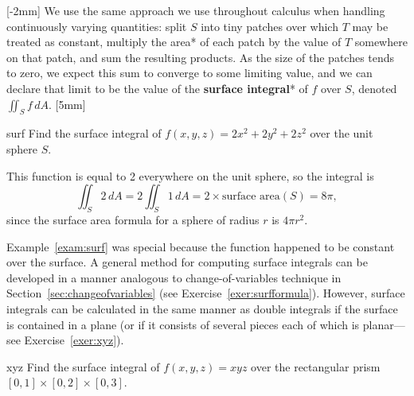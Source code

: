 \documentclass[svgnames]{watsonbook}
\begin{document}
[-2mm]
We use the same approach we use throughout calculus when handling
continuously varying quantities: split $S$ into
tiny patches over which $T$ may be treated as constant,
multiply the area* of each patch by the value of $T$ somewhere on that patch, and
sum the resulting products. As the size of the patches tends to zero,
we expect this sum to converge to some limiting value, and we can
declare that limit to be the value of the \textbf{surface integral}* of $f$ over
$S$, denoted $\iint_S f \, dA$. [5mm]

\begin{example}{}{surf}
  Find the surface integral of $f(x,y,z) = 2x^2 +2y^2 + 2z^2$ over the
  unit sphere $S$. 
\end{example}

\begin{solution}
  This function is equal to 2 everywhere on the unit sphere, so the
  integral is
  \[
    \iint_{S} 2 \,dA =     2 \iint_{S} 1 \,dA = 2 \times \text{surface
      area}(S) = 8\pi, 
  \]
  since the surface area formula for a sphere of radius $r$ is $4\pi
  r^2$. 
\end{solution}

Example~\ref{exam:surf} was special because the function happened to
be constant over the surface. A general method for computing surface
integrals can be developed in a manner analogous to
change-of-variables technique in
Section~\ref{sec:changeofvariables} (see Exercise~\ref{exer:surfformula}).
However, surface integrals can be
calculated in the same manner as double integrals if the surface is
contained in a plane (or if it consists of several pieces each of
which is planar---see Exercise~\ref{exer:xyz}). 

\begin{exercise}{}{xyz}
  Find the surface integral of $f(x,y,z) = xyz$ over the rectangular
  prism $[0,1] \times [0,2] \times [0,3]$. 
\end{exercise}
\end{document}
